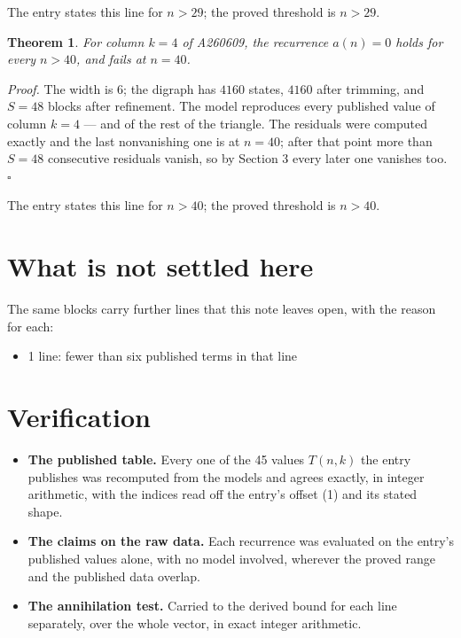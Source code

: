 \documentclass[11pt]{article}
\newtheorem{theorem}{Theorem}
\theoremstyle{definition}
\begin{document}
The entry states this line for $n > 29$; the proved threshold is $n > 29$.

\begin{theorem} For column $k = 4$ of A260609, the recurrence $a(n) = 0$ holds for every $n > 40$, and fails at $n = 40$.\end{theorem}

{\itshape Proof.} The width is $6$; the digraph has $4160$ states, $4160$ after trimming, and $S = 48$ blocks after refinement. The model reproduces every published value of column $k = 4$ --- and of the rest of the triangle. The residuals were computed exactly and the last nonvanishing one is at $n = 40$; after that point more than $S = 48$ consecutive residuals vanish, so by Section 3 every later one vanishes too. $\square$

The entry states this line for $n > 40$; the proved threshold is $n > 40$.

\section{What is not settled here}

The same blocks carry further lines that this note leaves open, with the reason for each:

\begin{itemize}

\item 1 line: fewer than six published terms in that line

\end{itemize}

\section{Verification}

\begin{itemize}

\item {\bfseries The published table.} Every one of the 45 values $T(n,k)$ the entry publishes was recomputed from the models and agrees exactly, in integer arithmetic, with the indices read off the entry's offset (1) and its stated shape.

\item {\bfseries The claims on the raw data.} Each recurrence was evaluated on the entry's published values alone, with no model involved, wherever the proved range and the published data overlap.

\item {\bfseries The annihilation test.} Carried to the derived bound for each line separately, over the whole vector, in exact integer arithmetic.

\end{itemize}
\end{document}
